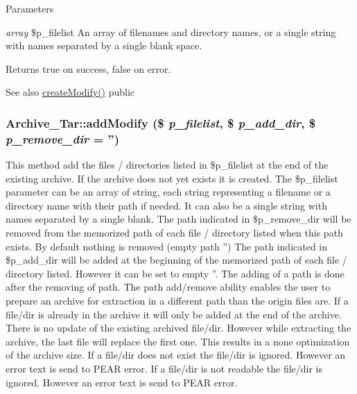 \begin{DoxyParams}{Parameters}
\item[{\em array}]\$p\_\-filelist An array of filenames and directory names, or a single string with names separated by a single blank space. \end{DoxyParams}
\begin{DoxyReturn}{Returns}
true on success, false on error. 
\end{DoxyReturn}
\begin{DoxySeeAlso}{See also}
\hyperlink{classArchive__Tar_accecf70468a22e87d19a927f6802b8f2}{createModify()}  public 
\end{DoxySeeAlso}
\hypertarget{classArchive__Tar_a87c8ae9ed359f1caf7d346649d9155a4}{
\subsubsection[{addModify}]{\setlength{\rightskip}{0pt plus 5cm}Archive\_\-Tar::addModify (\$ {\em p\_\-filelist}, \/  \$ {\em p\_\-add\_\-dir}, \/  \$ {\em p\_\-remove\_\-dir} = {\ttfamily ''})}}
\label{classArchive__Tar_a87c8ae9ed359f1caf7d346649d9155a4}
This method add the files / directories listed in \$p\_\-filelist at the end of the existing archive. If the archive does not yet exists it is created. The \$p\_\-filelist parameter can be an array of string, each string representing a filename or a directory name with their path if needed. It can also be a single string with names separated by a single blank. The path indicated in \$p\_\-remove\_\-dir will be removed from the memorized path of each file / directory listed when this path exists. By default nothing is removed (empty path '') The path indicated in \$p\_\-add\_\-dir will be added at the beginning of the memorized path of each file / directory listed. However it can be set to empty ''. The adding of a path is done after the removing of path. The path add/remove ability enables the user to prepare an archive for extraction in a different path than the origin files are. If a file/dir is already in the archive it will only be added at the end of the archive. There is no update of the existing archived file/dir. However while extracting the archive, the last file will replace the first one. This results in a none optimization of the archive size. If a file/dir does not exist the file/dir is ignored. However an error text is send to PEAR error. If a file/dir is not readable the file/dir is ignored. However an error text is send to PEAR error.


